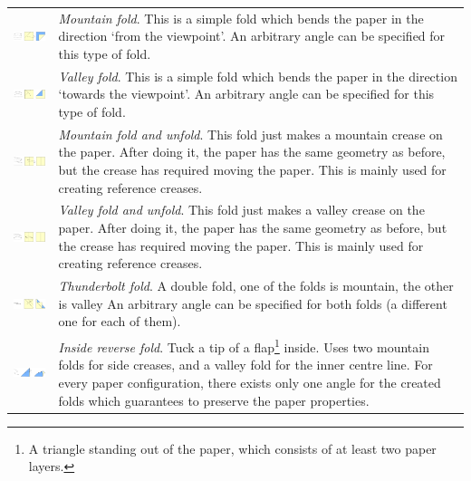 \begin{savenotes}
\begin{longtable}{lp{9cm}}
\includegraphics[width=4cm]{images/folds_mountain} & \emph{Mountain fold}. This is a simple fold which bends the paper in the direction `from the viewpoint'. An arbitrary angle can be specified for this type of fold.\\
\includegraphics[width=4cm]{images/folds_valley} & \emph{Valley fold}. This is a simple fold which bends the paper in the direction `towards the viewpoint'. An arbitrary angle can be specified for this type of fold.\\
\includegraphics[width=4cm]{images/folds_fold_unfold_mountain} & \emph{Mountain fold and unfold}. This fold just makes a mountain crease on the paper. After doing it, the paper has the same geometry as before, but the crease has required moving the paper. This is mainly used for creating reference creases.\\
\includegraphics[width=4cm]{images/folds_fold_unfold_valley} & \emph{Valley fold and unfold}. This fold just makes a valley crease on the paper. After doing it, the paper has the same geometry as before, but the crease has required moving the paper. This is mainly used for creating reference creases.\\
\includegraphics[width=4cm]{images/folds_thunderbolt} & \emph{Thunderbolt fold}. A double fold, one of the folds is mountain, the other is valley An arbitrary angle can be specified for both folds (a different one for each of them).\\
\includegraphics[width=4cm]{images/folds_reverse_inside} & \emph{Inside reverse fold}. Tuck a tip of a flap\footnote{A triangle standing out of the paper, which consists of at least two paper layers.} inside. Uses two mountain folds for side creases, and a valley fold for the inner centre line. For every paper configuration, there exists only one angle for the created folds which guarantees to preserve the paper properties.\\

\end{longtable}
\end{savenotes}
